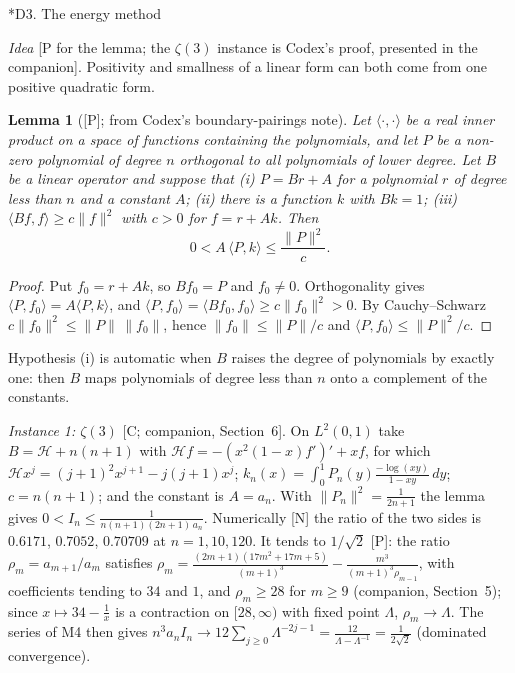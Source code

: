 \documentclass[11pt,a4paper]{article}
\makeatletter
\newcommand{\dd}{\,d}
\newcommand{\st}[1]{\textsf{[#1]}}
\newtheorem{lemma}[theorem]{Lemma}
\theoremstyle{definition}
\renewcommand\section{\@startsection{section}{1}{\z@}{-2.2ex plus -.6ex minus -.2ex}{1.1ex plus .2ex}{\normalfont\large\bfseries}}
\makeatother
\begin{document}
\section*{D3. The energy method}

\emph{Idea} \st{P for the lemma; the $\zeta(3)$ instance is Codex's proof, presented in the
companion}. Positivity and smallness of a linear form can both come from one positive quadratic form.

\begin{lemma}[\st{P}; from Codex's boundary-pairings note]\label{lem:energy}
Let $\langle\cdot,\cdot\rangle$ be a real inner product on a space of functions containing the
polynomials, and let $P$ be a non-zero polynomial of degree $n$ orthogonal to all polynomials of
lower degree. Let $B$ be a linear operator
and suppose that \textup{(i)} $P=Br+A$ for a polynomial $r$ of degree less than $n$ and a constant
$A$; \textup{(ii)} there is a function $k$ with $Bk=1$; \textup{(iii)}
$\langle Bf,f\rangle\ge c\|f\|^2$ with $c>0$ for $f=r+Ak$. Then
\[
0<A\,\langle P,k\rangle\le\frac{\|P\|^2}{c}.
\]
\end{lemma}
\begin{proof}
Put $f_0=r+Ak$, so $Bf_0=P$ and $f_0\ne0$. Orthogonality gives
$\langle P,f_0\rangle=A\langle P,k\rangle$, and $\langle P,f_0\rangle=\langle Bf_0,f_0\rangle\ge c\|f_0\|^2>0$.
By Cauchy--Schwarz $c\|f_0\|^2\le\|P\|\,\|f_0\|$, hence $\|f_0\|\le\|P\|/c$ and
$\langle P,f_0\rangle\le\|P\|^2/c$.
\end{proof}
Hypothesis (i) is automatic when $B$ raises the degree of polynomials by exactly one: then
$B$ maps polynomials of degree less than $n$ onto a complement of the constants.

\emph{Instance 1: $\zeta(3)$} \st{C; companion, Section~6}. On $L^2(0,1)$ take
$B=\mathcal H+n(n+1)$ with $\mathcal Hf=-(x^2(1-x)f')'+xf$, for which
$\mathcal Hx^j=(j+1)^2x^{j+1}-j(j+1)x^j$; $k_n(x)=\int_0^1P_n(y)\frac{-\log(xy)}{1-xy}\dd y$; $c=n(n+1)$; and
the constant is $A=a_n$. With $\|P_n\|^2=\frac1{2n+1}$ the lemma gives
$0<I_n\le\frac1{n(n+1)(2n+1)\,a_n}$. Numerically \st{N} the ratio of the two sides is $0.6171$, $0.7052$, $0.70709$ at $n=1,10,120$.
It tends to $1/\sqrt2$ \st{P}: the ratio $\rho_m=a_{m+1}/a_m$ satisfies
$\rho_m=\frac{(2m+1)(17m^2+17m+5)}{(m+1)^3}-\frac{m^3}{(m+1)^3\rho_{m-1}}$, with coefficients tending to
$34$ and $1$, and $\rho_m\ge28$ for $m\ge9$ (companion, Section~5); since $x\mapsto34-\frac1x$ is a
contraction on $[28,\infty)$ with fixed point $\Lambda$, $\rho_m\to\Lambda$. The series of M4 then gives
$n^3a_nI_n\to12\sum_{j\ge0}\Lambda^{-2j-1}=\frac{12}{\Lambda-\Lambda^{-1}}=\frac1{2\sqrt2}$ (dominated
convergence).
\end{document}
